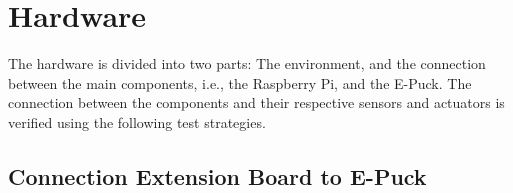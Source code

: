 \documentclass[a4paper,parskip,headheight=38pt]{scrartcl} %
\newcommand{\teststrat}[5]{
    \subsubsection{Test Strategy}
	\textbf{Component:} #1 \\
	\noindent\textbf{What should be tested?} \\
    \noindent #2 \\
	\noindent\textbf{How can it be tested?} \\
    \noindent\textcolor{blue}{Setup:} #3 \\
    \noindent\textcolor{blue}{Applicable Techniques:} #4 \\
	\noindent\textbf{What cannot be tested? Why?} \\
    \noindent #5
}
\newcommand{\ie}{i.e.}
\newcommand{\BLACK}{\textbf{Integration test: }}
\begin{document}


\section{Hardware} 
The hardware is divided into two parts: The environment, and the connection
between the main components, \ie, the Raspberry Pi, and the E-Puck. 
The connection between the components and their respective sensors and actuators
is verified using the following test strategies.

\subsection{Connection Extension Board to E-Puck}
\end{document}
